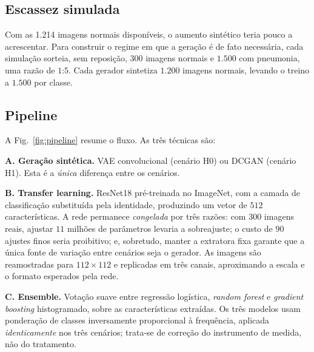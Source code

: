 \documentclass[conference]{IEEEtran}
\begin{document}
\subsection{Escassez simulada}

Com as 1.214 imagens normais disponíveis, o aumento sintético teria pouco a
acrescentar. Para construir o regime em que a geração é de fato necessária,
cada simulação sorteia, sem reposição, $300$ imagens normais e $1.500$ com
pneumonia, uma razão de $1$:$5$. Cada gerador sintetiza $1.200$ imagens
normais, levando o treino a $1.500$ por classe.

\subsection{Pipeline}

A Fig.~\ref{fig:pipeline} resume o fluxo. As três técnicas são:

\textbf{A. Geração sintética.} VAE convolucional (cenário H0) ou DCGAN
(cenário H1). Esta é a \emph{única} diferença entre os cenários.

\textbf{B. Transfer learning.} ResNet18 pré-treinada no ImageNet, com a camada
de classificação substituída pela identidade, produzindo um vetor de $512$
características. A rede permanece \emph{congelada} por três razões: com $300$
imagens reais, ajustar $11$ milhões de parâmetros levaria a sobreajuste; o
custo de $90$ ajustes finos seria proibitivo; e, sobretudo, manter a extratora
fixa garante que a única fonte de variação entre cenários seja o gerador. As
imagens são reamostradas para $112 \times 112$ e replicadas em três canais,
aproximando a escala e o formato esperados pela rede.

\textbf{C. Ensemble.} Votação suave entre regressão logística, \emph{random
forest} e \emph{gradient boosting} histogramado, sobre as características
extraídas. Os três modelos usam ponderação de classes inversamente
proporcional à frequência, aplicada \emph{identicamente} nos três cenários;
trata-se de correção do instrumento de medida, não do tratamento.
\end{document}
